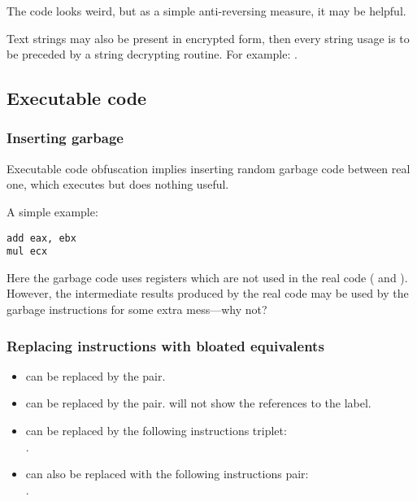The code looks weird, but as a simple anti-reversing measure, it may be helpful.

Text strings may also be present in encrypted form, 
then every string usage is to be preceded by a string decrypting routine.
For example: .

\subsection{Executable code}

\subsubsection{Inserting garbage}

Executable code obfuscation implies inserting random garbage code between real one,
which executes but does nothing useful.

A simple example:

\begin{lstlisting}[caption=original code]
add	eax, ebx
mul	ecx
\end{lstlisting}



Here the garbage code uses registers which are not used in the real code ( and ).
However, the intermediate results produced by the real code 
may be used by the garbage instructions for some extra mess---why not?

\subsubsection{Replacing instructions with bloated equivalents}

\begin{itemize}
\item {} can be replaced by the  pair.
\item {} can be replaced by the  pair. 
\IDA{} will not show the references to the label.
\item {} can be replaced by the following instructions triplet:\\
.
\item {} can also be replaced with the following instructions pair: \\
.%

\end{itemize}

